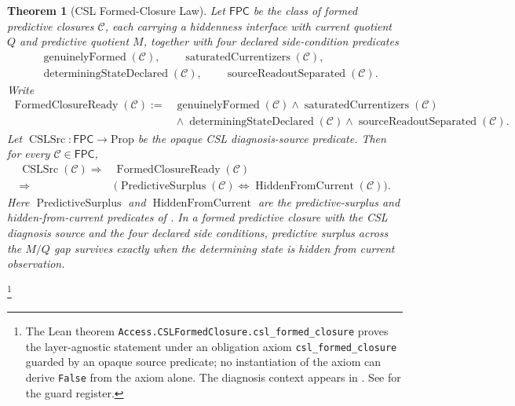 \documentclass[11pt]{article}
\newcommand{\currQ}{Q}                 \newcommand{\predM}{M}                 \newcommand{\splitObs}{\Delta}         \newcommand{\quotMap}{\pi}             \newcommand{\accessQ}{q_I}             \newcommand{\obsSig}{\sigma_I}         \newcommand{\closureForm}{\mathsf{cl}} \newcommand{\BirdInt}{\mathsf{BirdInt}}
\newtheorem{theorem}{Theorem}[section]
\theoremstyle{definition}
\begin{document}
\begin{theorem}[CSL Formed-Closure Law]\label{thm:F13b}
Let \(\mathsf{FPC}\) be the class of formed predictive closures
\(\mathcal C\), each carrying a hiddenness interface with current
quotient \(\currQ\) and predictive quotient \(\predM\), together with
four declared side-condition predicates
\begin{align*}
  &\operatorname{genuinelyFormed}(\mathcal C),\qquad
  \operatorname{saturatedCurrentizers}(\mathcal C),\\
  &\operatorname{determiningStateDeclared}(\mathcal C),\qquad
  \operatorname{sourceReadoutSeparated}(\mathcal C).
\end{align*}
Write
\begin{align*}
  \operatorname{FormedClosureReady}(\mathcal C)
  :={}&
  \operatorname{genuinelyFormed}(\mathcal C)
  \wedge\operatorname{saturatedCurrentizers}(\mathcal C)\\
  &{}\wedge\operatorname{determiningStateDeclared}(\mathcal C)
  \wedge\operatorname{sourceReadoutSeparated}(\mathcal C).
\end{align*}
Let \(\operatorname{CSLSrc}:\mathsf{FPC}\to\mathrm{Prop}\) be the
opaque CSL diagnosis-source predicate.
Then for every \(\mathcal C\in\mathsf{FPC}\),
\begin{align*}
  \operatorname{CSLSrc}(\mathcal C)
  \Longrightarrow{}&
    \operatorname{FormedClosureReady}(\mathcal C)\\
  \Longrightarrow{}&
    \bigl(
      \operatorname{PredictiveSurplus}(\mathcal C)
      \iff
      \operatorname{HiddenFromCurrent}(\mathcal C)
    \bigr).
\end{align*}
Here \(\operatorname{PredictiveSurplus}\) and
\(\operatorname{HiddenFromCurrent}\) are the predictive-surplus and
hidden-from-current predicates of .  In
a formed predictive closure with the CSL diagnosis source and the
four declared side conditions, predictive surplus across the
\(\predM/\currQ\) gap survives exactly when the determining state is
hidden from current observation.
\end{theorem}
\footnote{The Lean theorem
\texttt{Access.CSLFormedClosure.csl\_formed\_closure}
proves the layer-agnostic statement under an obligation axiom
\texttt{csl\_formed\_closure} guarded by an opaque source predicate;
no instantiation of the axiom can derive \texttt{False} from the
axiom alone.  The diagnosis context appears in
\citep{Tsiokos2026CSL}.  See  for the guard
register.}
\end{document}

